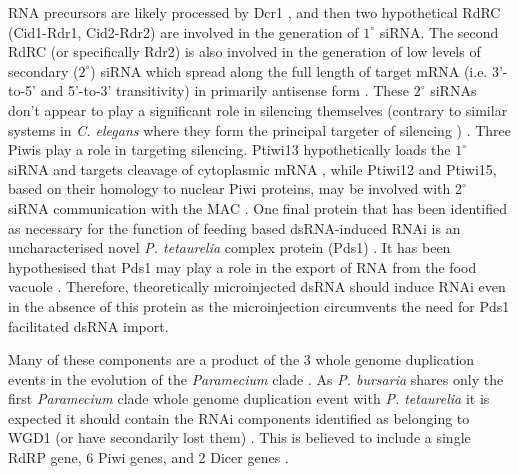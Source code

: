RNA precursors are likely processed
by Dcr1 \citep{Lepere2009}, and then two hypothetical RdRC (Cid1-Rdr1, Cid2-Rdr2)
\citep{Marker2010,Marker2014} are involved in the generation of \(1^{\circ}\) 
siRNA.  
The second RdRC (or specifically Rdr2) is also involved in the generation
of low levels of secondary (\(2^{\circ}\)) siRNA which spread along the full length of
target mRNA (i.e. 3'-to-5' and 5'-to-3' transitivity) in primarily
antisense form \citep{Carradec2015}.  These \(2^{\circ}\) siRNAs don't
appear to play a significant role in silencing themselves (contrary to similar
systems in \textit{C. elegans} where they form the principal targeter of silencing 
\citep{Sijen2007,Pak2007}) \citep{Carradec2015}.
Three Piwis play a role in targeting silencing.  Ptiwi13 hypothetically
loads the \(1^{\circ}\) siRNA and targets cleavage of cytoplasmic mRNA \citep{Bouhouche2011},
while Ptiwi12 and Ptiwi15, based on their homology to nuclear Piwi proteins,
\citep{Marker2014,Carradec2015,Bouhouche2011} may be involved
with \(2^{\circ}\) siRNA communication with the MAC \citep{Carradec2015}.
One final protein that has been identified as necessary 
for the function of feeding based dsRNA-induced
RNAi is an uncharacterised novel \textit{P. tetaurelia} complex protein (Pds1) \citep{Marker2014}.
It has been hypothesised that Pds1 may play a role in the export of RNA from 
the food vacuole \citep{Carradec2015}.  Therefore, theoretically
microinjected dsRNA should induce RNAi even in the absence of this protein
as the microinjection circumvents the need for Pds1 facilitated dsRNA import.


Many of these components are a product of the 3 whole genome duplication
events in the evolution of the \textit{Paramecium} clade \citep{McGrath2014}.
As \textit{P. bursaria} shares only the first \textit{Paramecium} clade whole
genome duplication event with \textit{P. tetaurelia} it is expected
it should contain the RNAi components identified as belonging to WGD1 (or have 
secondarily lost them) \citep{McGrath2014}.
This is believed to include a single RdRP gene, 6 Piwi genes, and 2 Dicer genes \citep{Marker2014}.



